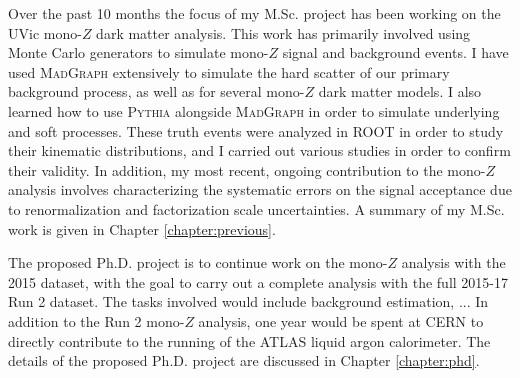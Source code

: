 \label{chapter:introduction}

Over the past 10 months the focus of my M.Sc. project has been working on the UVic mono-$Z$ dark matter analysis. This work has primarily involved using Monte Carlo generators to simulate mono-$Z$ signal and background events. I have used \textsc{MadGraph} extensively to simulate the hard scatter of our primary background process, as well as for several mono-$Z$ dark matter models. I also learned how to use \textsc{Pythia} alongside \textsc{MadGraph} in order to simulate underlying and soft processes. These truth events were analyzed in ROOT in order to study their kinematic distributions, and I carried out various studies in order to confirm their validity. In addition, my most recent, ongoing contribution to the mono-$Z$ analysis involves characterizing the systematic errors on the signal acceptance due to renormalization and factorization scale uncertainties. A summary of my M.Sc. work is given in Chapter \ref{chapter:previous}. 

The proposed Ph.D. project is to continue work on the mono-$Z$ analysis with the 2015 dataset, with the goal to carry out a complete analysis with the full 2015-17 Run 2 dataset. The tasks involved would include background estimation, ... In addition to the Run 2 mono-$Z$ analysis, one year would be spent at CERN to directly contribute to the running of the ATLAS liquid argon calorimeter. The details of the proposed Ph.D. project are discussed in Chapter \ref{chapter:phd}.